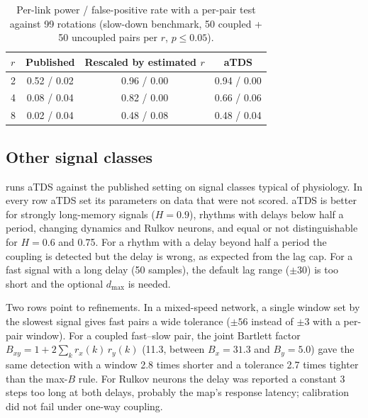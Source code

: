 \documentclass[11pt,a4paper]{article}
\begin{document}
\begin{table}[t]
\centering
\caption{Per-link power / false-positive rate with a per-pair test against 99 rotations (slow-down benchmark, 50 coupled + 50 uncoupled pairs per $r$, $p \le 0.05$).}
\label{tab:power}
\footnotesize
\begin{tabular}{lccc}
\toprule
$r$ & Published & Rescaled by estimated $r$ & aTDS \\
\midrule
2 & 0.52 / 0.02 & 0.96 / 0.00 & 0.94 / 0.00 \\
4 & 0.08 / 0.04 & 0.82 / 0.00 & 0.66 / 0.06 \\
8 & 0.02 / 0.04 & 0.48 / 0.08 & 0.48 / 0.04 \\
\bottomrule
\end{tabular}
\end{table}

\subsection{Other signal classes}
 runs aTDS against the published setting on signal classes typical of physiology. In every row aTDS set its parameters on data that were not scored. aTDS is better for strongly long-memory signals ($H = 0.9$), rhythms with delays below half a period, changing dynamics and Rulkov neurons, and equal or not distinguishable for $H = 0.6$ and 0.75. For a rhythm with a delay beyond half a period the coupling is detected but the delay is wrong, as expected from the lag cap. For a fast signal with a long delay (50 samples), the default lag range ($\pm30$) is too short and the optional $d_{\max}$ is needed.



Two rows point to refinements. In a mixed-speed network, a single window set by the slowest signal gives fast pairs a wide tolerance ($\pm56$ instead of $\pm3$ with a per-pair window). For a coupled fast--slow pair, the joint Bartlett factor $B_{xy} = 1 + 2\sum_k r_x(k)\, r_y(k)$ (11.3, between $B_x = 31.3$ and $B_y = 5.0$) gave the same detection with a window 2.8 times shorter and a tolerance 2.7 times tighter than the max-$B$ rule. For Rulkov neurons the delay was reported a constant 3 steps too long at both delays, probably the map's response latency; calibration did not fail under one-way coupling.
\end{document}
